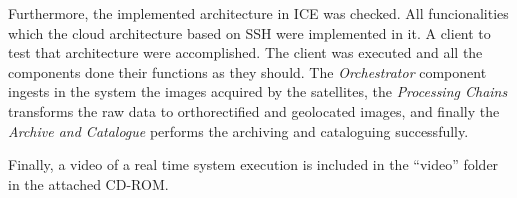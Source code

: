 Furthermore, the implemented architecture in ICE was checked. All funcionalities
which the cloud architecture based on \ac{SSH} were implemented in it. A client
to test that architecture were accomplished. The client was executed and all the
components done their functions as they should. The  \emph{Orchestrator}
component ingests in the system the images acquired by the satellites, the
\emph{Processing Chains} transforms the raw data to orthorectified and
geolocated images, and finally the \emph{Archive and Catalogue} performs the
archiving and cataloguing successfully. 

Finally, a video of a real time system execution is included in the ``video''
folder in the attached CD-ROM.

